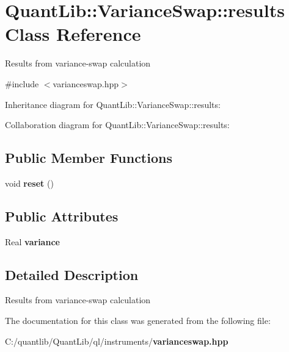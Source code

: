 \section{Quant\+Lib\+:\+:Variance\+Swap\+:\+:results Class Reference}
\label{class_quant_lib_1_1_variance_swap_1_1results}


Results from variance-\/swap calculation  




{\ttfamily \#include $<$varianceswap.\+hpp$>$}



Inheritance diagram for Quant\+Lib\+:\+:Variance\+Swap\+:\+:results\+:


Collaboration diagram for Quant\+Lib\+:\+:Variance\+Swap\+:\+:results\+:
\subsection*{Public Member Functions}
\begin{DoxyCompactItemize}
\item 
void {\bfseries reset} ()\label{class_quant_lib_1_1_variance_swap_1_1results_af3eb148270c40badd6e5cda7b27e5818}

\end{DoxyCompactItemize}
\subsection*{Public Attributes}
\begin{DoxyCompactItemize}
\item 
Real {\bfseries variance}\label{class_quant_lib_1_1_variance_swap_1_1results_ab0099c2d29606a41720afbbe8a0f6408}

\end{DoxyCompactItemize}


\subsection{Detailed Description}
Results from variance-\/swap calculation 

The documentation for this class was generated from the following file\+:\begin{DoxyCompactItemize}
\item 
C\+:/quantlib/\+Quant\+Lib/ql/instruments/{\bf varianceswap.\+hpp}\end{DoxyCompactItemize}
